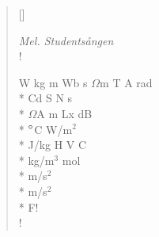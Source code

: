 \settowidth{\versewidth}{J/kg H V C}


\begin{verse}[\versewidth]

\flagverse{}
\emph{Mel. Studentsången}\\!

W kg m Wb s $\Omega$m T A rad\\*
Cd S N s\\*
$\Omega$A m Lx dB\\*
$\degree$C W/m${}^2$\\*
J/kg H V C\\*
kg/m${}^3$ mol\\*
m/s${}^2$\\*
m/s${}^2$\\*
F!\\!




\end{verse}

